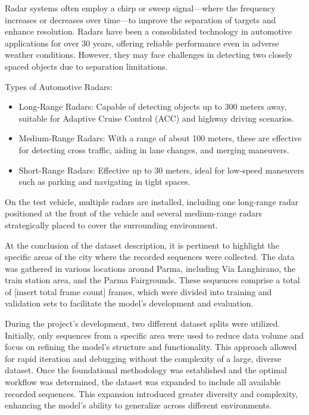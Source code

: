 Radar systems often employ a chirp or sweep signal—where the frequency increases or decreases over time—to improve the separation of targets and enhance resolution. Radars have been a consolidated technology in automotive applications for over 30 years, offering reliable performance even in adverse weather conditions. However, they may face challenges in detecting two closely spaced objects due to separation limitations.

Types of Automotive Radars:
\begin{itemize}
    \item Long-Range Radars: Capable of detecting objects up to 300 meters away, suitable for Adaptive Cruise Control (ACC) and highway driving scenarios.
    \item Medium-Range Radars: With a range of about 100 meters, these are effective for detecting cross traffic, aiding in lane changes, and merging maneuvers.
    \item Short-Range Radars: Effective up to 30 meters, ideal for low-speed maneuvers such as parking and navigating in tight spaces.
\end{itemize}

On the test vehicle, multiple radars are installed, including one long-range radar positioned at the front of the vehicle and several medium-range radars strategically placed to cover the surrounding environment.

At the conclusion of the dataset description, it is pertinent to highlight the specific areas of the city where the recorded sequences were collected. The data was gathered in various locations around Parma, including Via Langhirano, the train station area, and the Parma Fairgrounds. These sequences comprise a total of [insert total frame count] frames, which were divided into training and validation sets to facilitate the model's development and evaluation.

During the project's development, two different dataset splits were utilized. Initially, only sequences from a specific area were used to reduce data volume and focus on refining the model's structure and functionality. This approach allowed for rapid iteration and debugging without the complexity of a large, diverse dataset. Once the foundational methodology was established and the optimal workflow was determined, the dataset was expanded to include all available recorded sequences. This expansion introduced greater diversity and complexity, enhancing the model's ability to generalize across different environments.

